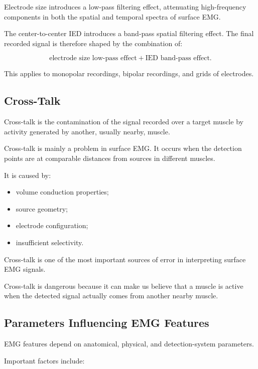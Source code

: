 Electrode size introduces a low-pass filtering effect, attenuating high-frequency components in both the spatial and temporal spectra of surface EMG.

The center-to-center IED introduces a band-pass spatial filtering effect. The final recorded signal is therefore shaped by the combination of:

\[
\text{electrode size low-pass effect}
+
\text{IED band-pass effect}.
\]

This applies to monopolar recordings, bipolar recordings, and grids of electrodes.

\subsection{Cross-Talk}

Cross-talk is the contamination of the signal recorded over a target muscle by activity generated by another, usually nearby, muscle.

Cross-talk is mainly a problem in surface EMG. It occurs when the detection points are at comparable distances from sources in different muscles.

It is caused by:

\begin{itemize}[noitemsep]
    \item volume conduction properties;
    \item source geometry;
    \item electrode configuration;
    \item insufficient selectivity.
\end{itemize}

Cross-talk is one of the most important sources of error in interpreting surface EMG signals.

\begin{authornote}
Cross-talk is dangerous because it can make us believe that a muscle is active when the detected signal actually comes from another nearby muscle.
\end{authornote}

\subsection{Parameters Influencing EMG Features}

EMG features depend on anatomical, physical, and detection-system parameters.

Important factors include:

